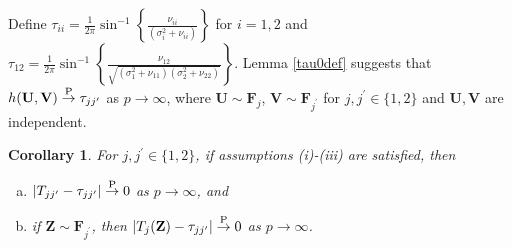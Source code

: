 \documentclass[twoside]{article}
\newcommand{\bZ}{\mathbf{Z}}
\newcommand{\bF}{\mathbf{F}}
\newcommand{\bU}{\mathbf{U}}
\newcommand{\bV}{\mathbf{V}}
\newcommand{\0}{\mathbf{0}}
\newcommand{\1}{\mathbf{1}}
\numberwithin{equation}{section}
\newtheorem{cor}[thm]{Corollary}
\begin{document}
Define $\tau_{ii}=\frac{1}{2\pi}\sin^{-1}\left \{\frac{\nu_{ii}}{(\sigma^2_i + \nu_{ii})}\right\}$ for $i=1,2$ and $\tau_{12}=\frac{1}{2\pi}\sin^{-1}\left \{\frac{\nu_{12}}{\sqrt{(\sigma^2_1 + \nu_{11})(\sigma^2_2 + \nu_{22})}}\right\}$. Lemma \ref{tau0def} suggests that $h(\bU,\bV)\stackrel{\rm P}{\to}\tau_{jj^\prime}$ as $p\to\infty$, where $\bU\sim\bF_j$, $\bV\sim\bF_{j^\prime}$ for $j,j^\prime\in\{1,2\}$ and $\bU,\bV$ are independent.
\begin{cor}\label{L0}
 For $j,j^\prime\in\{1,2\}$, if assumptions {\rm (i)-(iii)} are satisfied, then
 \begin{enumerate}[(a)]
  \item $|T_{jj^\prime}-\tau_{jj^\prime}|\stackrel{\rm P}{\to}0$ as $p\to\infty $, and
  \item if $\bZ\sim \bF_{j^\prime}$, then $|T_{j}(\bZ)-\tau_{jj^\prime}|\stackrel{\rm P}{\to}0$ as $p\to\infty $.
 \end{enumerate}
\end{cor}
\end{document}
